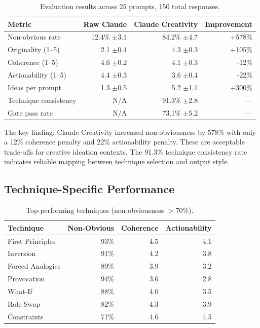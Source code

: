 \documentclass[11pt,a4paper]{article}
\begin{document}
\begin{table}[H]
\centering
\begin{tabular}{@{}lrrr@{}}
\toprule
\textbf{Metric} & \textbf{Raw Claude} & \textbf{Claude Creativity} & \textbf{Improvement} \\
\midrule
Non-obvious rate & 12.4\% $\pm$3.1 & 84.2\% $\pm$4.7 & +578\% \\
Originality (1--5) & 2.1 $\pm$0.4 & 4.3 $\pm$0.3 & +105\% \\
Coherence (1--5) & 4.6 $\pm$0.2 & 4.1 $\pm$0.3 & -12\% \\
Actionability (1--5) & 4.4 $\pm$0.3 & 3.6 $\pm$0.4 & -22\% \\
Ideas per prompt & 1.3 $\pm$0.5 & 5.2 $\pm$1.1 & +300\% \\
Technique consistency & N/A & 91.3\% $\pm$2.8 & --- \\
Gate pass rate & N/A & 73.1\% $\pm$5.2 & --- \\
\midrule
\end{tabular}
\caption{Evaluation results across 25 prompts, 150 total responses.}
\label{tab:results}
\end{table}

The key finding: Claude Creativity increased non-obviousness by 578\% with only a 12\% coherence penalty and 22\% actionability penalty. These are acceptable trade-offs for creative ideation contexts. The 91.3\% technique consistency rate indicates reliable mapping between technique selection and output style.

\subsection{Technique-Specific Performance}

\begin{table}[H]
\centering
\begin{tabular}{@{}lrrr@{}}
\toprule
\textbf{Technique} & \textbf{Non-Obvious} & \textbf{Coherence} & \textbf{Actionability} \\
\midrule
First Principles & 93\% & 4.5 & 4.1 \\
Inversion & 91\% & 4.2 & 3.8 \\
Forced Analogies & 89\% & 3.9 & 3.2 \\
Provocation & 94\% & 3.6 & 2.8 \\
What-If & 88\% & 4.0 & 3.5 \\
Role Swap & 82\% & 4.3 & 3.9 \\
Constraints & 71\% & 4.6 & 4.5 \\
\bottomrule
\end{tabular}
\caption{Top-performing techniques (non-obviousness $>$70\%).}
\label{tab:techniques}
\end{table}
\end{document}
